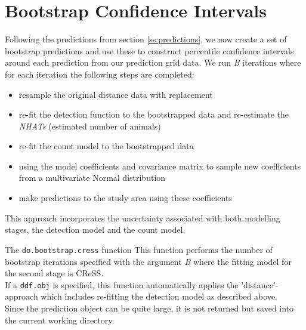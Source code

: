 \section{Bootstrap Confidence Intervals}
\label{ss:bootstrap}
\noindent Following the predictions from section \ref{ss:predictions}, we now create a set of bootstrap predictions and use these to construct percentile confidence intervals around each prediction from our prediction grid data. We run \textit{B} iterations where for each iteration the following steps are completed: 
\begin{itemize}
\item{resample the original distance data with replacement}
\item{re-fit the detection function to the bootstrapped data and re-estimate the \textit{NHATs} (estimated number of animals)}
\item{re-fit the count model to the bootstrapped data}
\item{using the model coefficients and covariance matrix to sample new coefficients from a multivariate Normal distribution}
\item{make predictions to the study area using these coefficients}
\end{itemize}
\begin{block}{}
This approach incorporates the uncertainty associated with both modelling stages, the detection model and the count model. 
\end{block}

\begin{block}{The {\tt do.bootstrap.cress} function}
This function performs the number of bootstrap iterations specified with the argument \textit{B} where the fitting model for the second stage is CReSS. \\
If a {\tt ddf.obj} is specified, this function automatically applies the 'distance'-approach which includes re-fitting the detection model as described above.\\
Since the prediction object can be quite large, it is not returned but saved into the current working directory. 
\end{block}

\begin{knitrout}\footnotesize
{}\color{fgcolor}
\end{knitrout}

